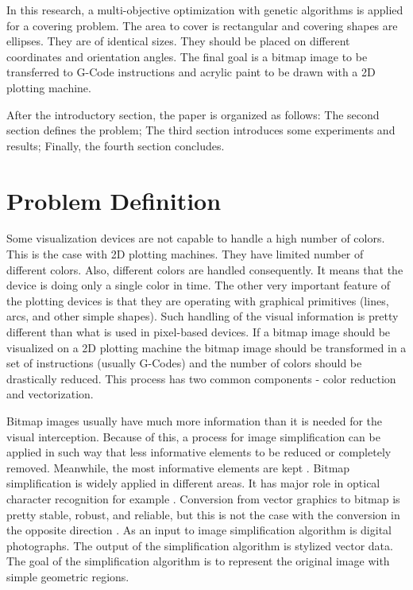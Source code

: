 \documentclass[conference]{IEEEtran}
\begin{document}
In this research, a multi-objective optimization with genetic algorithms is applied for a covering problem. The area to cover is rectangular and covering shapes are ellipses. They are of identical sizes. They should be placed on different coordinates and orientation angles. The final goal is a bitmap image to be transferred to G-Code instructions and acrylic paint to be drawn with a 2D plotting machine. 

After the introductory section, the paper is organized as follows: The second section defines the problem; The third section introduces some experiments and results; Finally, the fourth section concludes. 

\section{Problem Definition}

Some visualization devices are not capable to handle a high number of colors. This is the case with 2D plotting machines. They have limited number of different colors. Also, different colors are handled consequently. It means that the device is doing only a single color in time. The other very important feature of the plotting devices is that they are operating with graphical primitives (lines, arcs, and other simple shapes). Such handling of the visual information is pretty different than what is used in pixel-based devices. If a bitmap image should be visualized on a 2D plotting machine the bitmap image should be transformed in a set of instructions (usually G-Codes) and the number of colors should be drastically reduced. This process has two common components -  color reduction and vectorization.

Bitmap images usually have much more information than it is needed for the visual interception. Because of this, a process for image simplification can be applied in such way that less informative elements to be reduced or completely removed. Meanwhile, the most informative elements are kept \cite{Ferreira-Fonseca-Jorge-Ramalho-2004}. Bitmap simplification is widely applied in different areas. It has major role in optical character recognition for example \cite{Wenyin-Dori-1999}. Conversion from vector graphics to bitmap is pretty stable, robust, and reliable, but this is not the case with the conversion in the opposite direction \cite{Tombre-Ah-Soon-Dosch-Masini-Tabbone-1999}. As an input to image simplification algorithm is digital photographs. The output of the simplification algorithm is stylized vector data. The goal of the simplification algorithm is to represent the original image with simple geometric regions.
\end{document}
